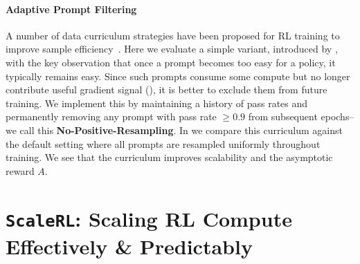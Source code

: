 \documentclass[]{fairmeta} %
\newcommand{\scalerl}{\texttt{\textbf{ScaleRL}}}
\begin{document}
\paragraph{Adaptive Prompt Filtering}

A number of data curriculum strategies have been proposed for RL training to improve sample efficiency~\citep{polaris2025,speedrl,greso}. Here we evaluate a simple variant, introduced by \citet{polaris2025}, with the key observation that once a prompt becomes too easy for a policy, it typically remains easy.
Since such prompts consume some compute but no longer contribute useful gradient signal (), it is better to exclude them from future training. 
We implement this by maintaining a history of pass rates and permanently removing any prompt with pass rate $\geq 0.9$ from subsequent epochs--we call this \textbf{No-Positive-Resampling}.
In  we compare this curriculum against the default setting where all prompts are resampled uniformly throughout training. 
We see that the curriculum improves scalability and the asymptotic reward $A$.

\section{\scalerl: Scaling RL Compute Effectively \& Predictably}
\label{sec:loo}
\end{document}
